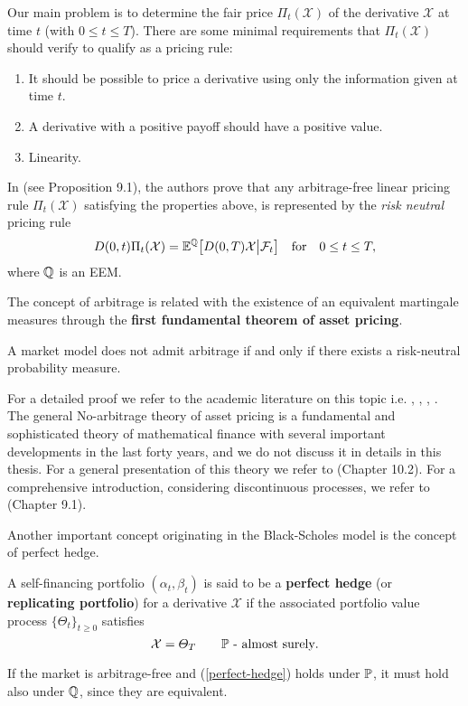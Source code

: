 Our main problem is to determine the
fair price $\Pi_t(\mathcal{X})$ of the derivative $\mathcal{X}$ at time $t$ (with $0 \leq t \leq T$).
There are some minimal requirements that $\Pi_t(\mathcal{X})$ should verify to qualify as a pricing rule:
\begin{enumerate}
 \item It should be possible to price a derivative using only the information given at time $t$.
 \item A derivative with a positive payoff should have a positive value.
 \item Linearity.
\end{enumerate}
In \cite{Cont} (see Proposition 9.1), the authors prove that any arbitrage-free linear pricing rule $\Pi_t(\mathcal{X})$ satisfying the properties above, 
is represented by the \emph{risk neutral} pricing rule
\begin{equation}\label{derivative_price}
 D(0,t) \Pi_t(\mathcal{X}) = \mathbb{E}^{\mathbb{Q}} \bigl[ D(0,T) \mathcal{X} \big| \mathcal{F}_t \bigr] \quad \mbox{for} \quad 0\leq t \leq T,
\end{equation}
where $\mathbb{Q}$ is an EEM.

The concept of arbitrage is related with the existence of an equivalent martingale measures through the \textbf{first fundamental theorem of asset pricing}.
\begin{Theorem}
 A market model does not admit arbitrage if and only if there exists a risk-neutral probability measure. 
\end{Theorem}
For a detailed proof we refer to the academic literature on this topic i.e. \cite{HaKr79}, \cite{HaPl81}, \cite{Sch02}, \cite{DelSch98}.
The general No-arbitrage theory of asset pricing is a fundamental and sophisticated theory of mathematical finance with several important developments 
in the last forty years, and we do not discuss it in details in this thesis.
For a general presentation of this theory we refer to \cite{Bjork} (Chapter 10.2). For a comprehensive introduction, 
considering discontinuous processes, we refer to \cite{Cont} (Chapter 9.1).

Another important concept originating in the Black-Scholes model is the concept of perfect hedge.
\begin{Definition}
 A self-financing portfolio $(\alpha_t,\beta_t)$ is said to be a \textbf{perfect hedge} (or \textbf{replicating portfolio}) for a derivative  
 $\mathcal{X}$ if the associated portfolio value process $\{\varTheta_t\}_{t\geq0}$ satisfies
 \begin{equation}\label{perfect-hedge}
    \mathcal{X}  = \varTheta_T   \quad \quad \mathbb{P} \mbox{ - almost surely}. 
  \end{equation}
\end{Definition}
If the market is arbitrage-free and
(\ref{perfect-hedge}) holds under $\mathbb{P}$, it must hold also under $\mathbb{Q}$, since they are equivalent.

